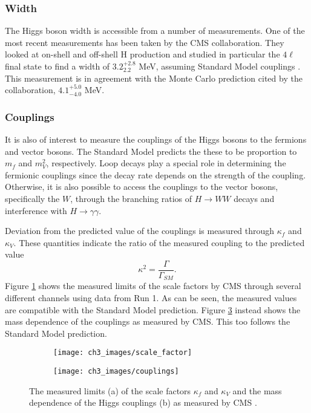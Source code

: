 \documentclass[10pt,a4paper]{book}
\begin{document}
\subsubsection{Width}
The Higgs boson width is accessible from a number of measurements. One of the most recent measurements has been taken by the CMS collaboration. They looked at on-shell and off-shell H production and studied in particular the $4\ell$ final state to find a width of $3.2^{+2.8}_{2.2}$ MeV, assuming Standard Model couplings \cite{CMS:2019ekd}. This measurement is in agreement with the Monte Carlo prediction cited by the collaboration, $4.1^{+5.0}_{-4.0}$ MeV.

\subsubsection{Couplings}
It is also of interest to measure the couplings of the Higgs bosons to the fermions and vector bosons. The Standard Model predicts the these to be proportion to $m_f$ and $m_{V}^2$, respectively. Loop decays play a special role in determining the fermionic couplings since the decay rate depends on the strength of the coupling. Otherwise, it is also possible to access the couplings to the vector bosons, specifically the $W$, through the branching ratios of $H \rightarrow WW$ decays and interference with $H \rightarrow \gamma\gamma$.

Deviation from the predicted value of the couplings is measured through $\kappa_f$ and $\kappa_V$. These quantities indicate the ratio of the measured coupling to the predicted value
\begin{equation}
\kappa^2 = \frac{\Gamma}{\Gamma_{SM}}.
\end{equation}
Figure \ref{scale factor} shows the measured limits of the scale factors by CMS through several different channels using data from Run 1. As can be seen, the measured values are compatible with the Standard Model prediction. Figure \ref{mass dependence} instead shows the mass dependence of the couplings as measured by CMS. This too follows the Standard Model prediction. 

\begin{figure}
\begin{subfigure}{.5\textwidth}
\centering
\texttt{[image: ch3\_images/scale\_factor]}
\caption{}
\label{scale factor}
\end{subfigure}
\begin{subfigure}{.5\textwidth}
\texttt{[image: ch3\_images/couplings]}
\caption{}
\label{mass dependence}
\end{subfigure}
\caption{The measured limits (a) of the scale factors $\kappa_f$ and $\kappa_V$ and the mass dependence of the Higgs couplings (b) as measured by CMS \cite{higgs_review}. }
\end{figure}
\end{document}
